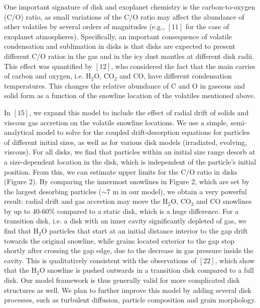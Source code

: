 \documentclass[12pt, letterpaper]{article}
\begin{document}
One important signature of disk and exoplanet chemistry is the carbon-to-oxygen (C/O) ratio, as small variations of the C/O ratio may affect the abundance of other volatiles by several orders of magnitudes (e.g., $[11]$ for the case of exoplanet atmospheres). Specifically, an important consequence of volatile condensation and sublimation in disks is that disks are expected to present different C/O ratios in the gas and in the icy dust mantles at different disk radii. This effect was quantified by $[12]$, who considered the fact that the main carries of carbon and oxygen, i.e. H$_2$O, CO$_2$ and CO, have different condensation temperatures. This changes the relative abundance of C and O in gaseous and solid form as a function of the snowline location of the volatiles mentioned above. 

In $[15]$, we expand this model to include the effect of radial drift of solids and viscous gas accretion on the volatile snowline locations. We use a simple, semi-analytical model to solve for the coupled drift-desorption equations for particles of different initial sizes, as well as for various disk models (irradiated, evolving, viscous). For all disks, we find that particles within an initial size range desorb at a size-dependent location in the disk, which is independent of the particle's initial position. From this, we can estimate upper limits for the C/O ratio in disks (Figure 2). %
By comparing the innermost snowlines in Figure 2, which are set by the largest desorbing particles ($\sim$7 m in our model), we obtain a very powerful result: radial drift and gas accretion may move the H$_2$O, CO$_2$ and CO snowlines by up to 40-60\% compared to a static disk, which is a huge difference. For a transition disk, i.e. a disk with an inner cavity significantly depleted of gas, we find that H$_2$O particles that start at an initial distance interior to the gap drift towards the original snowline, while grains located exterior to the gap stop shortly after crossing the gap edge, due to the decrease in gas pressure inside the cavity. This is qualitatively consistent with the observations of $[22]$, which show that the H$_2$O snowline is pushed outwards in a transition disk compared to a full disk. Our model framework is thus generally valid for more complicated disk structures as well. We plan to further improve this model by adding several disk processes, such as turbulent diffusion, particle composition and grain morphology.
\end{document}
